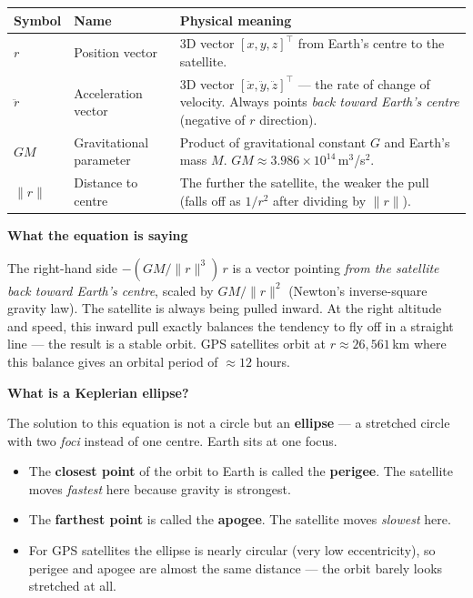\documentclass[12pt, a4paper]{article}
\begin{document}
\begin{center}
\begin{tabular}{@{} l p{3.2cm} p{7.8cm} @{}}
  \toprule
  Symbol & Name & Physical meaning \\
  \midrule
  $r$ & Position vector &
    3D vector $[x,y,z]^\top$ from Earth's centre to the satellite. \\
  $\ddot{r}$ & Acceleration vector &
    3D vector $[\ddot{x},\ddot{y},\ddot{z}]^\top$ --- the rate of
    change of velocity.
    Always points \emph{back toward Earth's centre} (negative of $r$
    direction). \\
  $GM$ & Gravitational parameter &
    Product of gravitational constant $G$ and Earth's mass $M$.
    $GM \approx 3.986\times10^{14}$\,m$^3$/s$^2$. \\
  $\|r\|$ & Distance to centre &
    The further the satellite, the weaker the pull
    (falls off as $1/r^2$ after dividing by $\|r\|$). \\
  \bottomrule
\end{tabular}
\end{center}

\begin{notebox}
  \textbf{What the equation is saying}

  The right-hand side $-(GM/\|r\|^3)\,r$ is a vector pointing
  \emph{from the satellite back toward Earth's centre}, scaled by
  $GM/\|r\|^2$ (Newton's inverse-square gravity law).
  The satellite is always being pulled inward.
  At the right altitude and speed, this inward pull exactly balances
  the tendency to fly off in a straight line --- the result is a
  stable orbit.
  GPS satellites orbit at $r \approx 26{,}561$\,km where this balance
  gives an orbital period of $\approx 12$ hours.
\end{notebox}

\textbf{What is a Keplerian ellipse?}

The solution to this equation is not a circle but an \textbf{ellipse}
--- a stretched circle with two \emph{foci} instead of one centre.
Earth sits at one focus.

\begin{itemize}[leftmargin=1.2em,itemsep=3pt]
  \item The \textbf{closest point} of the orbit to Earth is called the
    \textbf{perigee}.
    The satellite moves \emph{fastest} here because gravity is
    strongest.
  \item The \textbf{farthest point} is called the \textbf{apogee}.
    The satellite moves \emph{slowest} here.
  \item For GPS satellites the ellipse is nearly circular
    (very low eccentricity), so perigee and apogee are almost the
    same distance --- the orbit barely looks stretched at all.
\end{itemize}
\end{document}
